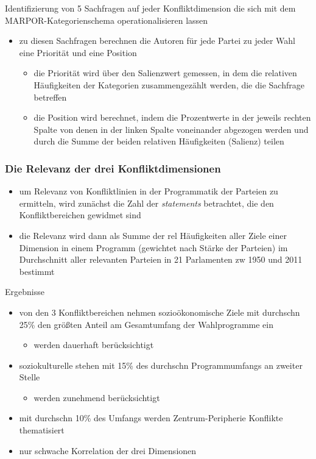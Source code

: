 \documentclass[11pt]{article}
\begin{document}
Identifizierung von 5 Sachfragen auf jeder Konfliktdimension die sich mit dem MARPOR-Kategorienschema operationalisieren lassen
\begin{itemize}
\item zu diesen Sachfragen berechnen die Autoren für jede Partei zu jeder Wahl eine Priorität und eine Position
\begin{itemize}
\item die Priorität wird über den Salienzwert gemessen, in dem die relativen Häufigkeiten der Kategorien zusammengezählt werden, die die Sachfrage betreffen
\item die Position wird berechnet, indem die Prozentwerte in der jeweils rechten Spalte von denen in der linken Spalte voneinander abgezogen werden und durch die Summe der beiden relativen Häufigkeiten (Salienz) teilen
\end{itemize}
\end{itemize}

\subsubsection{Die Relevanz der drei Konfliktdimensionen}
\label{sec:org6665f55}
\begin{itemize}
\item um Relevanz von Konfliktlinien in der Programmatik der Parteien zu ermitteln, wird zunächst die Zahl der \emph{statements} betrachtet, die den Konfliktbereichen gewidmet sind
\item die Relevanz wird dann als Summe der rel Häufigkeiten aller Ziele einer Dimension in einem Programm (gewichtet nach Stärke der Parteien) im Durchschnitt aller relevanten Parteien in 21 Parlamenten zw 1950 und 2011 bestimmt
\end{itemize}

Ergebnisse
\begin{itemize}
\item von den 3 Konfliktbereichen nehmen sozioökonomische Ziele mit durchschn 25\% den größten Anteil am Gesamtumfang der Wahlprogramme ein
\begin{itemize}
\item werden dauerhaft berücksichtigt
\end{itemize}
\item soziokulturelle stehen mit 15\% des durchschn Programmumfangs an zweiter Stelle
\begin{itemize}
\item werden zunehmend berücksichtigt
\end{itemize}
\item mit durchschn 10\% des Umfangs werden Zentrum-Peripherie Konflikte thematisiert
\item nur schwache Korrelation der drei Dimensionen
\end{itemize}
\end{document}
